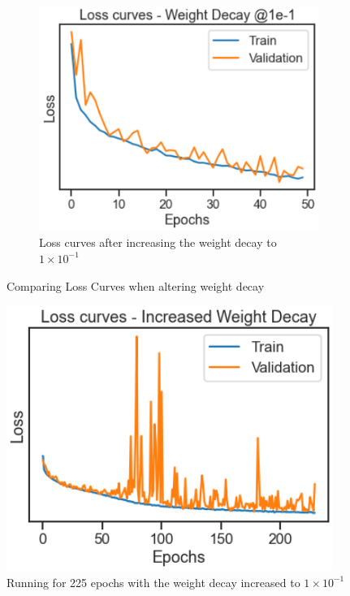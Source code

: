 \documentclass[a4paper, 12pt]{article}
\begin{document}
\begin{figure}[H]
\begin{subfigure}{.4\textwidth}
    \label{fig:wd1}
\end{subfigure} \hfill
\begin{subfigure}{.4\textwidth}
    \centering
    \includegraphics[width=1.1\textwidth, scale = 0.2]{Weightdecay2.PNG}
    \caption{Loss curves after increasing the weight decay to $1 \times 10^{-1}$}
    \label{fig:wd2}
\end{subfigure}%
\centering
\caption{Comparing Loss Curves when altering weight decay}

\end{figure}

\begin{figure}[H]
  \centering
  \includegraphics[scale = 0.5]{LossSpikes.PNG}
  \caption{Running for 225 epochs with the weight decay increased to $1 \times 10^{-1}$}
  \label{}
\end{figure}
\end{document}
